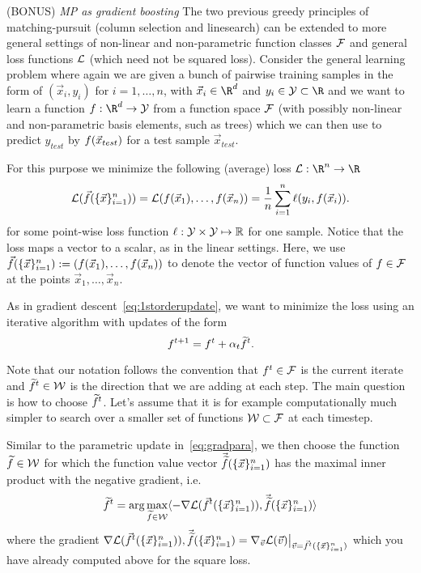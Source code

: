 \documentclass[preview]{standalone}
\begin{document}
\begin{Parts}
      





  
  
\Part (BONUS) \emph{MP as gradient boosting}
The two previous greedy principles of matching-pursuit (column selection and
linesearch) can be extended to more general settings of non-linear and
non-parametric function classes $\mathcal{F}$ and general loss functions
$\mathcal{L}$ (which need not be squared loss). Consider the general
learning problem where again we are given a bunch of pairwise training
samples in the form of $(\vec{x}_i,y_i)$ for $i=1,\dots,n$, with
$\vec{x}_i \in \R^d$ and $y_i\in \Y \subset \R$ and we want to learn a
function $\Func: \R^d \to \Y$ from a function space $\mathcal{F}$ (with
possibly non-linear and non-parametric basis elements, such as trees)
which we can then use to predict $y_{test}$ by $f(\vec{x}_{test})$
for a test sample $\vec{x}_{test}$.

  For this purpose we minimize the following (average) loss $\Loss:
  \R^n \to \R$
  \begin{equation*}
    \mathcal{L}(\vec{f}(\{\vec{x}\}_{i=1}^n)) =\mathcal{L}(f(\vec{x}_1), \dots, f(\vec{x}_n)) = \frac{1}{n}\sum_{i=1}^n \ell(y_i, f(\vec{x}_i)).
  \end{equation*}
  for some point-wise loss function $\ell : \mathcal{Y} \times \mathcal{Y} \mapsto \mathbb{R}$
  for one sample. Notice that the loss maps a vector to a scalar, as in
  the linear settings.
  Here, we use $\vec{f}(\{\vec{x}\}_{i=1}^n) := (f(\vec{x}_1), \dots, f(\vec{x}_n))$
  to denote the vector of function values of $f \in \mathcal{F}$ at the points $\vec{x}_1,\dots,\vec{x}_n$.
  

  As in gradient descent~\eqref{eq:1storderupdate}, we want to
  minimize the loss using an iterative algorithm with updates of the
  form
\begin{equation*}
  f^{t+1} = f^t + \alpha_t \widetilde{f}^{t}.
\end{equation*}

 Note that our notation follows the
convention that $f^t \in \mathcal{F}$ is the current iterate and $\widetilde{f}^t \in \mathcal{W}$ is the direction that we are adding at each step. The main question is how to choose $\widetilde{f}^{t}$.
Let's assume that it is for example computationally much simpler to
search over a smaller set of functions $\mathcal{W} \subset \mathcal{F}$ at
each timestep. 

Similar to the parametric update in~\eqref{eq:gradpara},
we then choose the function $\widetilde{f} \in \mathcal{W}$ for which the function value vector $\vec{{\widetilde{f}}}(\{\vec{x}\}_{i=1}^n)$ has the maximal inner product with the negative gradient, i.e.
\begin{equation}
  \label{eq:fgrad}
  \widetilde{f}^{t} =  \arg \max_{\widetilde{f} \in \mathcal{W}} \langle - \nabla \mathcal{L}(\vec{f}^t(\{\vec{x}\}_{i=1}^n)), \vec{{\widetilde{f}}}(\{\vec{x}\}_{i=1}^n) \rangle 
\end{equation}
where the gradient $\nabla \mathcal{L}(\vec{f}^t(\{\vec{x}\}_{i=1}^n)), \vec{{\widetilde{f}}}(\{\vec{x}\}_{i=1}^n) = \nabla_{\vec{v}} \mathcal{L}(\vec{v})\big\vert_{\vec{v} = \vec{f}^t(\{\vec{x}\}_{i=1}^n)}$ which you have already computed above for the square loss.


\end{Parts}
\end{document}
